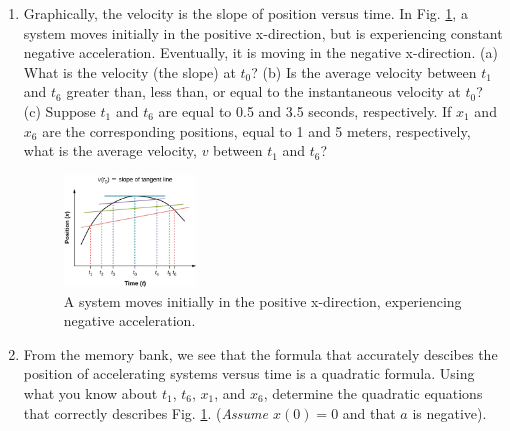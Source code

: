 \documentclass{article}
\begin{document}
\begin{enumerate}
\item Graphically, the velocity is the slope of position versus time.  In Fig. \ref{fig:1}, a system moves initially in the positive x-direction, but is experiencing constant negative acceleration.  Eventually, it is moving in the negative x-direction.  (a) What is the velocity (the slope) at $t_0$? (b) Is the average velocity between $t_1$ and $t_6$ greater than, less than, or equal to the instantaneous velocity at $t_0$? (c) Suppose $t_1$ and $t_6$ are equal to 0.5 and 3.5 seconds, respectively.  If $x_1$ and $x_6$ are the corresponding positions, equal to 1 and 5 meters, respectively, what is the average velocity, $v$ between $t_1$ and $t_6$?
\begin{figure}[hb]
\centering
\includegraphics[width=0.33\textwidth]{figures/slope.jpeg}
\caption{\label{fig:1} A system moves initially in the positive x-direction, experiencing negative acceleration.}
\end{figure}
\item From the memory bank, we see that the formula that accurately descibes the position of accelerating systems versus time is a quadratic formula.  Using what you know about $t_1$, $t_6$, $x_1$, and $x_6$, determine the quadratic equations that correctly describes Fig. \ref{fig:1}.  (\textit{Assume $x(0) = 0$} and that $a$ is negative).
\end{enumerate}
\end{document}
